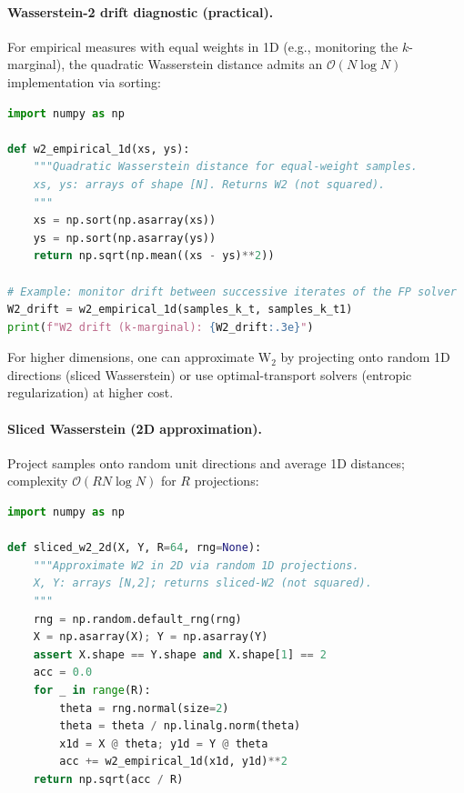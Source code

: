 \documentclass[11pt,letterpaper,oneside]{article}
\numberwithin{equation}{section}
\newcommand{\1}{\mathbf{1}}
\begin{document}
\paragraph{Wasserstein-2 drift diagnostic (practical).}
For empirical measures with equal weights in 1D (e.g., monitoring the $k$-marginal), the quadratic Wasserstein distance admits an $\mathcal O(N\log N)$ implementation via sorting:

\begin{lstlisting}[language=Python,caption={Empirical $\mathrm W_2$ in 1D via sorting (equal weights)}]
import numpy as np

def w2_empirical_1d(xs, ys):
    """Quadratic Wasserstein distance for equal-weight samples.
    xs, ys: arrays of shape [N]. Returns W2 (not squared).
    """
    xs = np.sort(np.asarray(xs))
    ys = np.sort(np.asarray(ys))
    return np.sqrt(np.mean((xs - ys)**2))

# Example: monitor drift between successive iterates of the FP solver
W2_drift = w2_empirical_1d(samples_k_t, samples_k_t1)
print(f"W2 drift (k-marginal): {W2_drift:.3e}")
\end{lstlisting}

For higher dimensions, one can approximate $\mathrm W_2$ by projecting onto random 1D directions (sliced Wasserstein) or use optimal-transport solvers (entropic regularization) at higher cost.

\paragraph{Sliced Wasserstein (2D approximation).}
Project samples onto random unit directions and average 1D distances; complexity $\mathcal O(R N\log N)$ for $R$ projections:

\begin{lstlisting}[language=Python,caption={Sliced $\mathrm W_2$ for 2D (equal weights)}]
import numpy as np

def sliced_w2_2d(X, Y, R=64, rng=None):
    """Approximate W2 in 2D via random 1D projections.
    X, Y: arrays [N,2]; returns sliced-W2 (not squared).
    """
    rng = np.random.default_rng(rng)
    X = np.asarray(X); Y = np.asarray(Y)
    assert X.shape == Y.shape and X.shape[1] == 2
    acc = 0.0
    for _ in range(R):
        theta = rng.normal(size=2)
        theta = theta / np.linalg.norm(theta)
        x1d = X @ theta; y1d = Y @ theta
        acc += w2_empirical_1d(x1d, y1d)**2
    return np.sqrt(acc / R)
\end{lstlisting}
\end{document}
